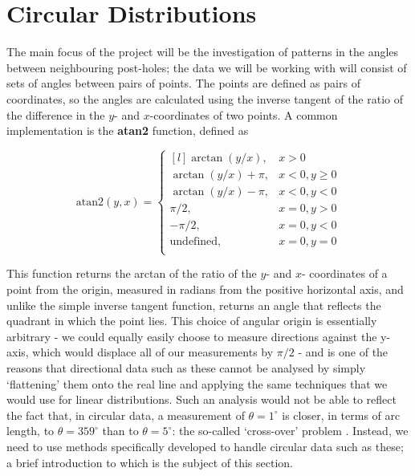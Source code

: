 \documentclass[../../ArchStats.tex]{subfiles}
\begin{document}



\section{Circular Distributions}

The main focus of the project will be the investigation of patterns in the angles between neighbouring post-holes; the data we will be working with will consist of sets of angles between pairs of points. The points are defined as pairs of coordinates, so the angles are calculated using the inverse tangent of the ratio of the difference in the $y$- and $x$-coordinates of two points. A common implementation is the \textbf{atan2} function, defined as

\begin{equation*}
\text{atan2} (y, x) = \left\lbrace \begin{matrix*}[l]
\arctan(y/x), & x > 0 \\
\arctan(y/x) + \pi, & x < 0, y \geq 0 \\
\arctan(y/x) - \pi, & x < 0, y < 0 \\
\pi/2, & x = 0, y > 0 \\
-\pi/2, & x = 0, y < 0 \\
\text{undefined}, & x = 0, y = 0 \\
\end{matrix*} \right. 
\end{equation*}

This function returns the arctan of the ratio of the $y$- and $x$- coordinates of a point from the origin, measured in radians from the positive horizontal axis, and unlike the simple inverse tangent function, returns an angle that reflects the quadrant in which the point lies. This choice of angular origin is essentially arbitrary - we could equally easily choose to measure directions against the y-axis, which would displace all of our measurements by $\pi/2$ - and is one of the reasons that directional  data such as these cannot be analysed by simply `flattening' them onto the real line and applying the same techniques that we would use for linear distributions. Such an analysis would not be able to reflect the fact that, in circular data, a measurement of $\theta = 1^\circ$ is closer, in terms of arc length, to $\theta = 359^\circ$ than to $\theta = 5^\circ$: the so-called `cross-over' problem \cite{Fisher1993}. Instead, we need to use methods specifically developed to handle circular data such as these; a brief introduction to which is the subject of this section. 
\end{document}
